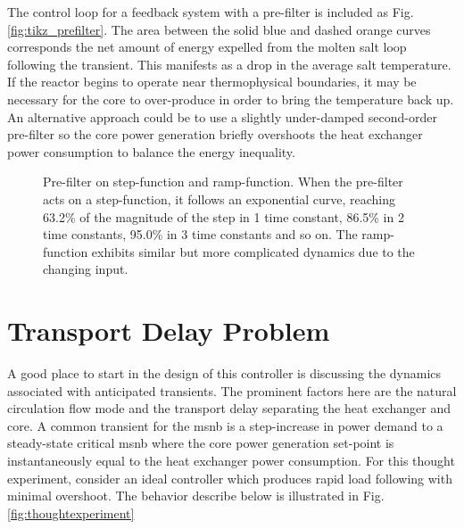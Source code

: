 The control loop for a feedback system with a pre-filter is included as Fig. \ref{fig:tikz_prefilter}. The area between the solid blue and dashed orange curves corresponds the net amount of energy expelled from the molten salt loop following the transient. This manifests as a drop in the average salt temperature. If the reactor begins to operate near thermophysical boundaries, it may be necessary for the core to over-produce in order to bring the temperature back up. An alternative approach could be to use a slightly under-damped second-order pre-filter so the core power generation briefly overshoots the heat exchanger power consumption to balance the energy inequality.

\begin{figure}[!ht]
    \centering
    \qquad
    \caption[Pre-filter on (a) step-function and (b) ramp-function]{Pre-filter on step-function and ramp-function. When the pre-filter acts on a step-function, it follows an exponential curve, reaching 63.2\% of the magnitude of the step in 1 time constant, 86.5\% in 2 time constants, 95.0\% in 3 time constants and so on. The ramp-function exhibits similar but more complicated dynamics due to the changing input.}
    \label{fig:pgf_prefilter}
\end{figure}

\section{Transport Delay Problem} 
A good place to start in the design of this controller is discussing the dynamics associated with anticipated transients. The prominent factors here are the natural circulation flow mode and the transport delay separating the heat exchanger and core. A common transient for the \acs{msnb} is a step-increase in power demand to a steady-state critical \acs{msnb} where the core power generation set-point is instantaneously equal to the heat exchanger power consumption. For this thought experiment, consider an ideal controller which produces rapid load following with minimal overshoot. The behavior describe below is illustrated in Fig. \ref{fig:thoughtexperiment}

